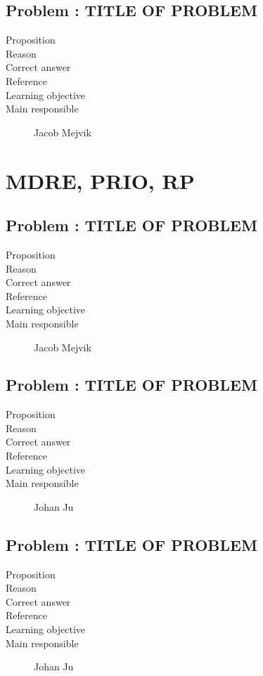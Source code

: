 \documentclass[10pt,a4paper]{article}
\begin{document}
\subsection*{Problem : TITLE OF PROBLEM}
\begin{description}
\item[Proposition] 
\item[Reason] 
\item[Correct answer]
\item[Reference]
\item[Learning objective]
\item[Main responsible] Jacob Mejvik
\end{description}

\section*{MDRE, PRIO, RP}
\subsection*{Problem : TITLE OF PROBLEM}
\begin{description}
\item[Proposition] 
\item[Reason] 
\item[Correct answer]
\item[Reference]
\item[Learning objective]
\item[Main responsible] Jacob Mejvik
\end{description}

\subsection*{Problem : TITLE OF PROBLEM}
\begin{description}
\item[Proposition] 
\item[Reason] 
\item[Correct answer]
\item[Reference]
\item[Learning objective]
\item[Main responsible] Johan Ju
\end{description}

\subsection*{Problem : TITLE OF PROBLEM}
\begin{description}
\item[Proposition] 
\item[Reason] 
\item[Correct answer]
\item[Reference]
\item[Learning objective]
\item[Main responsible] Johan Ju
\end{description}
\end{document}
